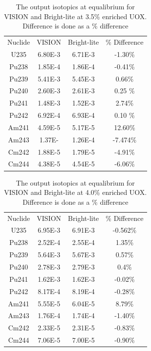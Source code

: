 \documentclass{article}
\begin{document}
\begin{table}[!htb]
\centering
\small
\caption{The output isotopics at equalibrium for VISION and Bright-lite at 3.5\% enriched UOX. Difference is done as a \% difference}
\label{tab:35}
\vspace{0.5em}
\begin{tabular}{cccc}
Nuclide &  VISION & Bright-lite & \% Difference \\
U235  & 6.80E-3 & 6.71E-3 & -1.30\%\\
Pu238 & 1.85E-4 & 1.86E-4 & -0.41\%\\
Pu239 & 5.41E-3 & 5.45E-3 & 0.66\%\\
Pu240 & 2.60E-3 & 2.61E-3 & 0.25 \%\\
Pu241 & 1.48E-3 & 1.52E-3 & 2.74\%\\
Pu242 & 6.92E-4 & 6.93E-4 & 0.10 \%\\
Am241 & 4.59E-5 & 5.17E-5 & 12.60\%\\
Am243 & 1.37E- & 1.26E-4 & -7.474\%\\
Cm242 & 1.88E-5 & 1.79E-5 & -4.91\%\\
Cm244 & 4.38E-5 & 4.54E-5 & -6.06\%\\
\end{tabular}
\end{table}

\begin{table}[!htb]
\centering
\small
\caption{The output isotopics at equalibrium for VISION and Bright-lite at 4.0\% enriched UOX. Difference is done as a \% difference}
\label{tab:40}
\vspace{0.5em}
\begin{tabular}{cccc}
Nuclide & VISION & Bright-lite & \% Difference \\
U235 & 6.95E-3 & 6.91E-3 & -0.562\%\\
Pu238 & 2.52E-4 & 2.55E-4 & 1.35\%\\
Pu239 & 5.64E-3 & 5.67E-3 & 0.57\%\\
Pu240 & 2.78E-3 & 2.79E-3 & 0.4\%\\
Pu241 & 1.62E-3  & 1.62E-3 & -0.02\%\\
Pu242 & 8.17E-4  & 8.19E-4 & -0.28\%\\
Am241 & 5.55E-5 & 6.04E-5 & 8.79\%\\
Am243 & 1.76E-4 & 1.74E-4 & -1.40\%\\
Cm242 & 2.33E-5 & 2.31E-5 & -0.83\%\\
Cm244 & 7.06E-5 & 7.00E-5 & -0.90\%\\
\end{tabular}
\end{table}
\end{document}
